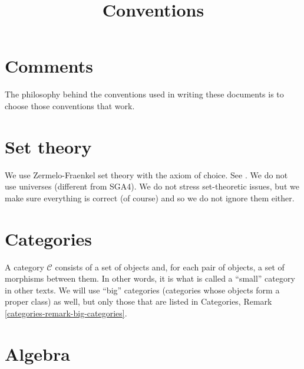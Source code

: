 

%

\newcommand{\TAG}{ZZZZ}

\title{Conventions}


\maketitle

\label{section-phantom}
\hypertarget{0002}{}
\reversemarginpar{}

\tableofcontents

\section{Comments}
\label{section-comments}
\hypertarget{0003}{}
\reversemarginpar{}

\noindent
The philosophy behind the conventions used in writing these documents is
to choose those conventions that work.

\section{Set theory}
\label{section-sets}
\hypertarget{0004}{}
\reversemarginpar{}

\noindent
We use Zermelo-Fraenkel set theory with the axiom of choice.
See \cite{Kunen}. We do not use
universes (different from SGA4). We do not stress set-theoretic issues,
but we make sure everything is correct (of course) and so we do not ignore
them either.


\section{Categories}
\label{section-categories}
\hypertarget{0005}{}
\reversemarginpar{}

\noindent
A category $\mathcal{C}$ consists of a set of objects and, for each pair
of objects,
a set of morphisms between them. In other words, it is what is called
a ``small'' category in other texts. We will use ``big'' categories
(categories whose objects form a proper class)
as well, but only those that are listed in Categories,
Remark \ref{categories-remark-big-categories}.

\section{Algebra}
\label{section-algebra}
\hypertarget{0006}{}
\reversemarginpar{}

